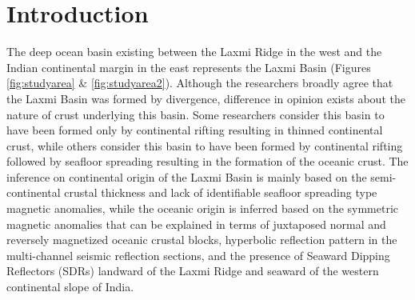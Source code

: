 \documentclass[twocolumn]{article}
\begin{document}
\section{Introduction}
The deep ocean basin existing between the Laxmi Ridge in the west and the Indian continental margin in the east represents the Laxmi Basin (Figures \ref{fig:studyarea} \& \ref{fig:studyarea2}). Although the researchers broadly agree that the Laxmi Basin was formed by divergence, difference in opinion exists about the nature of crust underlying this basin. Some researchers \citep{Naini1982,Kolla1990,Todal1998,Krishna2006,Nemcok2017,Geoffroy2020} consider this basin to have been formed only by continental rifting resulting in thinned continental crust, while others \citep{Biswas1988,Bhattacharya1994a,Talwani1998,Bernard2000,Yatheesh2007,Corfield2010,Eagles2013,Siawal2014,Bhattacharya2015,Misra2015,Ramana2015} consider this basin to have been formed by continental rifting followed by seafloor spreading resulting in the formation of the oceanic crust. The inference on continental origin of the Laxmi Basin is mainly based on the semi-continental crustal thickness and lack of identifiable seafloor spreading type magnetic anomalies, while the oceanic origin is inferred based on the symmetric magnetic anomalies that can be explained in terms of juxtaposed normal and reversely magnetized oceanic crustal blocks, hyperbolic reflection pattern in the multi-channel seismic reflection sections, and the presence of Seaward Dipping Reflectors (SDRs) landward of the Laxmi Ridge and seaward of the western continental slope of India.
\end{document}
